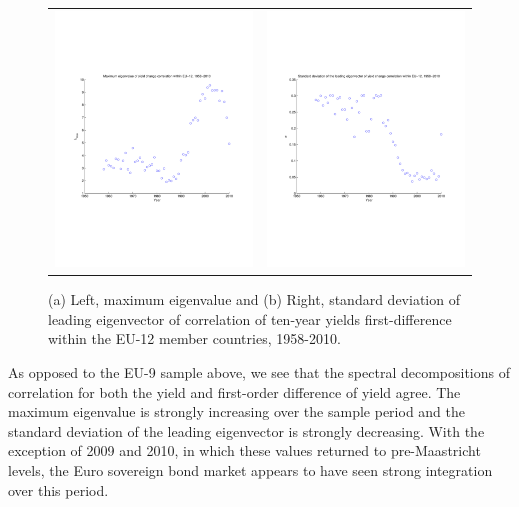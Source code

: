 \documentclass[3p]{elsarticle}
\begin{document}
\begin{figure}[ht!]
	\centering
	\begin{tabular}{cc}
		\includegraphics[width=7cm]{fig_diff_maxeig_eu12} & \includegraphics[width=7cm]{fig_diff_maxeigstd_eu12}
	\end{tabular}
	\caption{(a) Left, maximum eigenvalue and (b) Right, standard deviation of leading eigenvector of correlation of ten-year yields first-difference within the EU-12 member countries, 1958-2010.}
	\label{fig:diff_maxeig_eu12}
\end{figure}

As opposed to the EU-9 sample above, we see that the spectral decompositions of correlation for both the yield and first-order difference of yield agree.  The maximum eigenvalue is strongly increasing over the sample period and the standard deviation of the leading eigenvector is strongly decreasing.  With the exception of 2009 and 2010, in which these values returned to pre-Maastricht levels, the Euro sovereign bond market appears to have seen strong integration over this period.  
\end{document}
